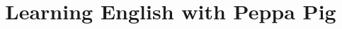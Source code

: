 \documentclass[a4paper]{article}
\begin{document}
\title{Learning English with Peppa Pig}

\author{}
\date{}


\maketitle
\begin{abstract}
\end{abstract}









\end{document}
